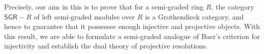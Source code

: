 \documentclass[reqno]{amsart}
\theoremstyle{definition}
\theoremstyle{remark}
\numberwithin{equation}{section}
\begin{document}
Precisely, our aim in this is to prove that for a semi-graded ring $R$, the category $\mathsf{SGR}-R$ of left semi-graded modules over $R$ is a Grothendieck category, and hence to guarantee that it possesses enough injective and projective objects. With this result, we are able to formulate a semi-graded analogue of Baer's criterion for injectivity and establish the dual theory of projective resolutions.


\end{document}
